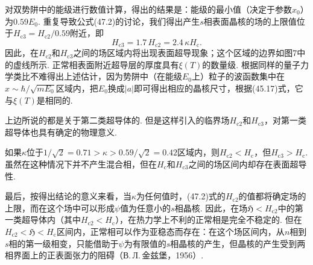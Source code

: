对双势阱中的能级进行数值计算，得出的结果是：能级的最小值（决定于参数$x_0$）为$0.59E_0$. 重复导致公式(47.2)的讨论，我们得出产生$s$相表面晶核的场的上限值位于$H_{\mathrm{c}3}=H_{\mathrm{c}2}/0.59$附近，即
\begin{equation}
H_{\mathrm{c}3}=1.7\,H_{\mathrm{c}2}=2.4\,\kappa H_{\mathrm{c}}.
\end{equation}
因此，在$H_{\mathrm{c}2}$和$H_{\mathrm{c}3}$之间的场区域内将出现表面超导现象；这个区域的边界如图7中的虚线所示. 正常相表面附近超导层的厚度具有$\xi(T)$的数量级. 根据同样的量子力学类比不难得出上述估计，因为势阱中（在能级$E_0$上）粒子的波函数集中在$x\sim\hbar/\sqrt{mE_0}$区域内，把$E_0$换成$|a|$即可得出相应的晶核尺寸，根据(45.17)式，它与$\xi(T)$是相同的.

上边所说的都是关于第二类超导体的. 但是这样引入的临界场$H_{\mathrm{c}2}$和$H_{\mathrm{c}3}$，对第一类超导体也具有确定的物理意义.

如果$\kappa$位于$1/\sqrt{2}=0.71>\kappa>0.59/\sqrt{2}=0.42$区域内，则$H_{\mathrm{c}2}<H_{\mathrm{c}}$，但$H_{\mathrm{c}3}>H_{\mathrm{c}}$. 虽然在这种情况下并不产生混合相，但在$H_{\mathrm{c}}$和$H_{\mathrm{c}3}$之间的场区间内却存在表面超导性.

最后，按得出结论的意义来看，当$\kappa$为任何值时，(47.2)式的$H_{\mathrm{c}2}$的值都将确定场的上限，而在这个场中可以形成$\psi$值为任意小的$s$相晶核. 因此，在场$\mathfrak{H}<H_{\mathrm{c}2}$中的第一类超导体内（其中$H_{\mathrm{c}2}<H_{\mathrm{c}}$），在热力学上不利的正常相是完全不稳定的. 但在$H_{\mathrm{c}2}<\mathfrak{H}<H_{\mathrm{c}}$区间内，正常相可以作为亚稳态而存在：在这个场区间内，从$n$相到$s$相的第一级相变，只能借助于$\psi$为有限值的$s$相晶核的产生，但晶核的产生受到两相界面上的正表面张力的阻碍（В.\,Л.\,金兹堡，1956）.

